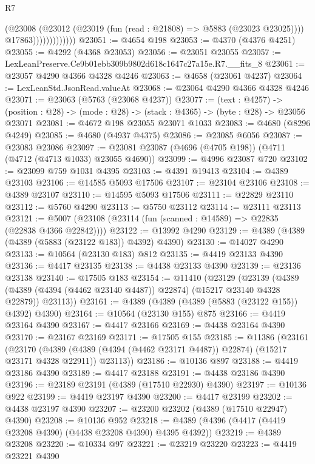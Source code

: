 \begin{lexlean}{R7}
\begin{coremodule}
                            (@23008
                              (@23012 (@23019 (fun (read : @21808) => @5883 (@23023 @23025))))
                              @17863)))))))))))))
@23051 := @4654 @198
@23053 := @4370 (@4376 @4251)
@23055 := @4292 (@4368 @23053)
@23056 := @23051 @23055
@23057 := LexLeanPreserve.Ce9b01ebb309b9802d618c1647c27a15e.R7.__fits_8
@23061 := @23057 @4290 @4366 @4328 @4246
@23063 := @4658 (@23061 @4237)
@23064 := LexLeanStd.JsonRead.valueAt
@23068 := @23064 @4290 @4366 @4328 @4246
@23071 := @23063 (@5763 (@23068 @4237))
@23077 := (text : @4257) ->
  (position : @28) -> (mode : @28) -> (stack : @4365) -> (byte : @28) -> @23056 @23071
@23081 := @4672 @198 @23055 @23071 @1033
@23083 := @4680 (@8296 @4249)
@23085 := @4680 (@4937 @4375)
@23086 := @23085 @6056
@23087 := @23083 @23086
@23097 := @23081 @23087 (@4696 (@4705 @198)) (@4711 (@4712 (@4713 @1033) @23055 @4690))
@23099 := @4996 @23087 @720
@23102 := @23099 @759 @1031 @4395
@23103 := @4391 @19413
@23104 := @4389 @23103
@23106 := @14585 @5093 @17506
@23107 := @23104 @23106
@23108 := @4389 @23107
@23110 := @14595 @5093 @17506
@23111 := @22829 @23110
@23112 := @5760 @4290
@23113 := @5750 @23112
@23114 := @23111 @23113
@23121 := @5007 (@23108 (@23114 (fun (scanned : @14589) => @22835 (@22838 @4366 @22842))))
@23122 := @13992 @4290
@23129 := @4389 (@4389 (@4389 (@5883 (@23122 @183)) @4392) @4390)
@23130 := @14027 @4290
@23133 := @10564 (@23130 @183) @812
@23135 := @4419 @23133 @4390
@23136 := @4417 @23135
@23138 := @4438 @23133 @4390
@23139 := @23136 @23138
@23140 := @17505 @183
@23154 := @11410
    (@23129
      (@23139
        (@4389 (@4389 (@4394 (@4462 @23140 @4487)) @22874) (@15217 @23140 @4328 @22879))
        @23113))
@23161 := @4389 (@4389 (@4389 (@5883 (@23122 @155)) @4392) @4390)
@23164 := @10564 (@23130 @155) @875
@23166 := @4419 @23164 @4390
@23167 := @4417 @23166
@23169 := @4438 @23164 @4390
@23170 := @23167 @23169
@23171 := @17505 @155
@23185 := @11386
    (@23161
      (@23170
        (@4389 (@4389 (@4394 (@4462 @23171 @4487)) @22874) (@15217 @23171 @4328 @22911))
        @23113))
@23186 := @10136 @897
@23188 := @4419 @23186 @4390
@23189 := @4417 @23188
@23191 := @4438 @23186 @4390
@23196 := @23189 @23191 (@4389 (@17510 @22930) @4390)
@23197 := @10136 @922
@23199 := @4419 @23197 @4390
@23200 := @4417 @23199
@23202 := @4438 @23197 @4390
@23207 := @23200 @23202 (@4389 (@17510 @22947) @4390)
@23208 := @10136 @952
@23218 := @4389 (@4396 (@4417 (@4419 @23208 @4390) (@4438 @23208 @4390) @4395 @4392))
@23219 := @4389 @23208
@23220 := @10334 @97
@23221 := @23219 @23220
@23223 := @4419 @23221 @4390

\end{coremodule}
\end{lexlean}
